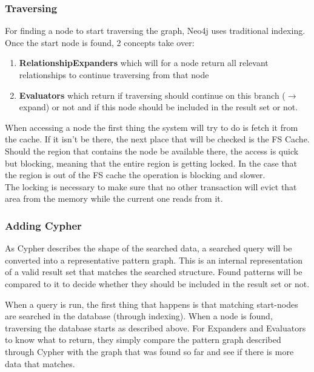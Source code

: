 \subsubsection{Traversing}
For finding a node to start traversing the graph, Neo4j uses traditional indexing. \citep[minute 32]{NeoInternals} Once the start node is found, 2 concepts take over:
\begin{enumerate}
\item \textbf{RelationshipExpanders} which will for a node return all relevant relationships to continue traversing from that node
\item \textbf{Evaluators} which return if traversing should continue on this branch ($ \rightarrow $ expand) or not and if this node should be included in the result set or not.
\end{enumerate}
When accessing a node the first thing the system will try to do is fetch it from the cache. If it isn't be there, the next place that will be checked is the FS Cache. Should the region that contains the node be available there, the access is quick but blocking, meaning that the entire region is getting locked. In the case that the region is out of the FS cache the operation is blocking and slower. \\
The locking is necessary to make sure that no other transaction will evict that area from the memory while the current one reads from it.

\subsubsection{Adding Cypher}
As Cypher describes the shape of the searched data, a searched query will be converted into a representative pattern graph. This is an internal representation of a valid result set that matches the searched structure. Found patterns will be compared to it to decide whether they should be included in the result set or not.

When a query is run, the first thing that happens is that matching start-nodes are searched in the database (through indexing). When a node is found, traversing the database starts as described above. For Expanders and Evaluators to know what to return, they simply compare the pattern graph described through Cypher with the graph that was found so far and see if there is more data that matches. 

